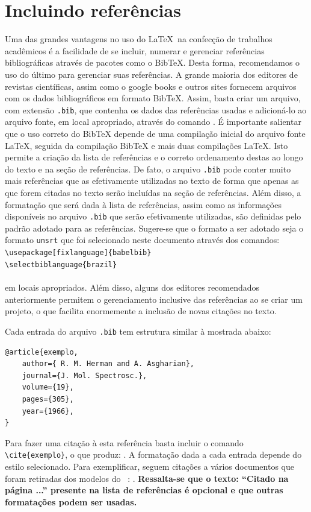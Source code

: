 \section{Incluindo referências}

Uma das grandes vantagens no uso do \LaTeX\ na confecção de trabalhos acadêmicos é a facilidade de se incluir, numerar e gerenciar referências bibliográficas através de pacotes como o BibTeX. Desta forma, recomendamos o uso do último para gerenciar suas referências. A grande maioria dos editores de revistas científicas, assim como o google books e outros sites fornecem arquivos com os dados bibliográficos em formato BibTeX. Assim, basta criar um arquivo, com extensão \verb+.bib+, que contenha os dados das referências usadas e adicioná-lo ao arquivo fonte, em local apropriado, através do comando \verb++. É importante salientar que o uso correto do BibTeX depende de uma compilação inicial do arquivo fonte \LaTeX, seguida da compilação BibTeX e mais duas compilações   \LaTeX. Isto permite a criação da lista de referências e o correto ordenamento destas ao longo do texto e na seção de referências. De fato, o arquivo \verb+.bib+ pode conter muito mais referências que as efetivamente utilizadas no texto de forma que apenas as que forem citadas no texto serão incluídas na seção de referências. Além disso, a formatação que será dada à lista de referências, assim como as informações disponíveis no arquivo \verb+.bib+ que serão efetivamente utilizadas, são definidas pelo padrão adotado para as referências. Sugere-se que o formato a ser adotado seja o formato \verb+unsrt+ que foi selecionado neste documento através dos comandos:\\
\verb+\usepackage[fixlanguage]{babelbib}+\\
\verb+\selectbiblanguage{brazil}+\\
\verb++\\
em locais apropriados. Além disso, alguns dos editores recomendados anteriormente permitem o gerenciamento inclusive das referências ao se criar um projeto, o que facilita enormemente a inclusão de novas citações no texto.

Cada entrada do arquivo \verb+.bib+ tem estrutura similar à mostrada abaixo:
\begin{verbatim}
@article{exemplo,
	author={ R. M. Herman and A. Asgharian},
	journal={J. Mol. Spectrosc.},
	volume={19},
	pages={305},
	year={1966},
}
\end{verbatim}
Para fazer uma citação à esta referência basta incluir o comando \verb+\cite{exemplo}+, o que produz: \cite{exemplo}. A formatação dada a cada entrada depende do estilo selecionado. Para exemplificar, seguem citações a vários documentos que foram retiradas dos modelos do \abnTeX\ \cite{abntex2modelo}: \cite{guizzardi2005,macedo2005,EIA649B,masolo2010,guarino1995,bates2010,doxiadis1965}.
 \textbf{Ressalta-se que o texto: ``Citado na página ...'' presente na lista de referências é opcional e que outras formatações podem ser usadas.}

